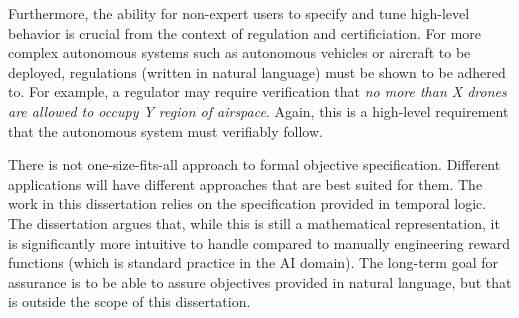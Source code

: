 Furthermore, the ability for non-expert users to specify and tune high-level behavior is crucial from the context of regulation and certificiation. For more complex autonomous systems such as autonomous vehicles or aircraft to be deployed, regulations (written in natural language) must be shown to be adhered to. For example, a regulator may require verification that \emph{no more than X drones are allowed to occupy Y region of airspace}. Again, this is a high-level requirement that the autonomous system must verifiably follow. 

There is not one-size-fits-all approach to formal objective specification. Different applications will have different approaches that are best suited for them. The work in this dissertation relies on the specification provided in temporal logic. The dissertation argues that, while this is still a mathematical representation, it is significantly more intuitive to handle compared to manually engineering reward functions (which is standard practice in the AI domain). The long-term goal for assurance is to be able to assure objectives provided in natural language, but that is outside the scope of this dissertation. 










